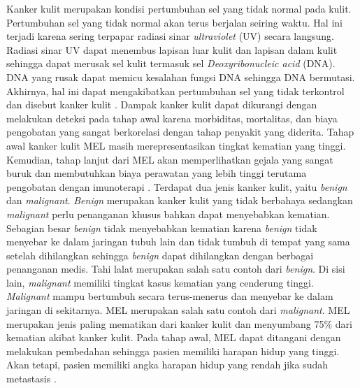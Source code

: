     Kanker kulit merupakan kondisi pertumbuhan sel yang tidak normal pada kulit. Pertumbuhan sel yang tidak normal akan terus berjalan seiring waktu. Hal ini terjadi karena sering terpapar radiasi sinar \textit{ultraviolet} (UV) secara langsung. Radiasi sinar UV dapat menembus lapisan luar kulit dan lapisan dalam kulit sehingga dapat merusak sel kulit termasuk sel \textit{Deoxyribonucleic acid} (DNA). DNA yang rusak dapat memicu kesalahan fungsi DNA sehingga DNA bermutasi. Akhirnya, hal ini dapat mengakibatkan pertumbuhan sel yang tidak terkontrol dan disebut kanker kulit \citep{Bhimavarapu2022}. Dampak kanker kulit dapat dikurangi dengan melakukan deteksi pada tahap awal karena morbiditas, mortalitas, dan biaya pengobatan yang sangat berkorelasi dengan tahap penyakit yang diderita. Tahap awal kanker kulit MEL masih merepresentasikan tingkat kematian yang tinggi. Kemudian, tahap lanjut dari MEL akan memperlihatkan gejala yang sangat buruk dan membutuhkan biaya perawatan yang lebih tinggi terutama pengobatan dengan imunoterapi \citep{Janda2022}. Terdapat dua jenis kanker kulit, yaitu \textit{benign} dan \textit{malignant}. \textit{Benign} merupakan kanker kulit yang tidak berbahaya sedangkan \textit{malignant} perlu penanganan khusus bahkan dapat menyebabkan kematian. Sebagian besar \textit{benign} tidak menyebabkan kematian karena \textit{benign} tidak menyebar ke dalam jaringan tubuh lain dan tidak tumbuh di tempat yang sama setelah dihilangkan sehingga \textit{benign} dapat dihilangkan dengan berbagai penanganan medis. Tahi lalat merupakan salah satu contoh dari \textit{benign}. Di sisi lain, \textit{malignant} memiliki tingkat kasus kematian yang cenderung tinggi. \textit{Malignant} mampu bertumbuh secara terus-menerus dan menyebar ke dalam jaringan di sekitarnya. MEL merupakan salah satu contoh dari \textit{malignant}. MEL merupakan jenis paling mematikan dari kanker kulit dan menyumbang 75\% dari kematian akibat kanker kulit. Pada tahap awal, MEL dapat ditangani dengan melakukan pembedahan sehingga pasien memiliki harapan hidup yang tinggi. Akan tetapi, pasien memiliki angka harapan hidup yang rendah jika sudah metastasis \citep{Davis2019}.

